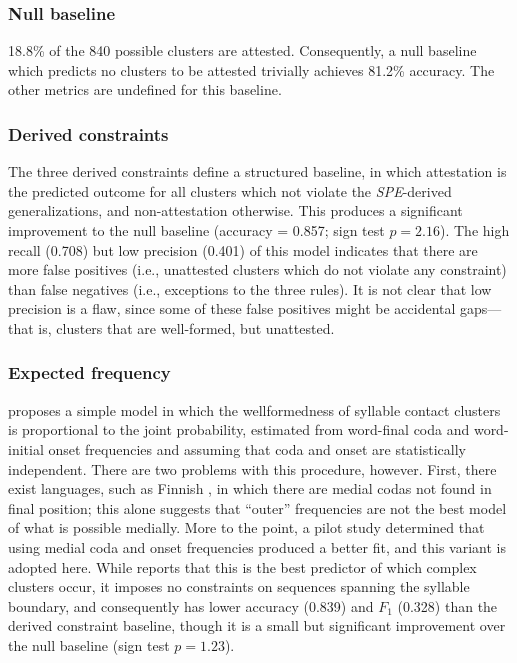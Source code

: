 \subsubsection{Null baseline}

18.8\% of the 840 possible clusters are attested. Consequently, a null baseline which predicts no clusters to be attested trivially achieves 81.2\% accuracy. The other metrics are undefined for this baseline.

\subsubsection{Derived constraints}

The three derived constraints define a structured baseline, in which attestation is the predicted outcome for all clusters which not violate the \emph{SPE}-derived generalizations, and non-attestation otherwise. This produces a significant improvement to the null baseline (accuracy = 0.857; sign test $p = 2.16$). The high recall (0.708) but low precision (0.401) of this model indicates that there are more false positives (i.e., unattested clusters which do not violate any constraint) than false negatives (i.e., exceptions to the three rules). It is not clear that low precision is a flaw, since some of these false positives might be accidental gaps---that is, clusters that are well-formed, but unattested.

\subsubsection{Expected frequency}

\citet{Pierrehumbert1994} proposes a simple model in which the wellformedness of syllable contact clusters is proportional to the joint probability, estimated from word-final coda and word-initial onset frequencies and assuming that coda and onset are statistically independent. There are two problems with this procedure, however. First, there exist languages, such as Finnish \citep[36]{Fischer-Jorgensen1952}, in which there are medial codas not found in final position; this alone suggests that ``outer'' frequencies are not the best model of what is possible medially. More to the point, a pilot study determined that using medial coda and onset frequencies produced a better fit, and this variant is adopted here. 
While \citeauthor{Pierrehumbert1994} reports that this is the best predictor of which complex clusters occur, it imposes no constraints on sequences spanning the syllable boundary, and consequently has lower accuracy (0.839) and $F_1$ (0.328) than the derived constraint baseline, though it is a small but significant improvement over the null baseline (sign test $p = 1.23$).

